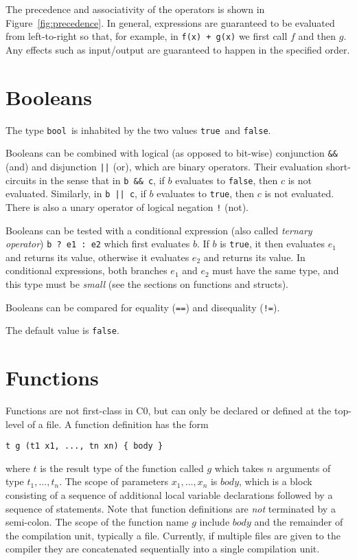 \documentclass[11pt]{article}
\newcommand{\tbool}{\texttt{bool}}
\newcommand{\vtrue}{\texttt{true}}
\newcommand{\vfalse}{\texttt{false}}
\begin{document}
The precedence and associativity of the operators is shown
in Figure~\ref{fig:precedence}.  In general, expressions are
guaranteed to be evaluated from left-to-right so that, for example,
in \verb'f(x) + g(x)' we first call $f$ and then $g$.  Any effects
such as input/output are guaranteed to happen in the specified
order.

\section{Booleans}

The type \tbool\ is inhabited by the two values \vtrue\ and \vfalse.

Booleans can be combined with logical (as opposed to bit-wise)
conjunction \verb'&&' (and) and disjunction \verb'||' (or), which are
binary operators.  Their evaluation short-circuits in the sense that
in \verb'b && c', if $b$ evaluates to \vfalse, then $c$ is not
evaluated.  Similarly, in \verb'b || c', if $b$ evaluates to \vtrue,
then $c$ is not evaluated.  There is also a unary operator of logical
negation \verb'!' (not).

Booleans can be tested with a conditional expression (also
called \emph{ternary operator}) \verb'b ? e1 : e2'
which first evaluates $b$.  If $b$ is \vtrue, it then evaluates
$e_1$ and returns its value, otherwise it evaluates $e_2$
and returns its value.  In conditional expressions, both
branches $e_1$ and $e_2$ must have the same type, and this type
must be \emph{small} (see the sections on functions and
structs).

Booleans can be compared for equality (\verb'==') and disequality
(\verb'!=').

The default value is \vfalse.

\section{Functions}

Functions are not first-class in C0, but can only be declared
or defined at the top-level of a file.  A function definition
has the form
\begin{verbatim}
t g (t1 x1, ..., tn xn) { body }
\end{verbatim}
where $t$ is the result type of the function called $g$ which takes
$n$ arguments of type $t_1, \ldots, t_n$.  The scope of parameters
$x_1, \ldots, x_n$ is $\mathit{body}$, which is a block consisting of
a sequence of additional local variable declarations followed by a
sequence of statements.  Note that function definitions are \emph{not}
terminated by a semi-colon.  The scope of the function name $g$
include $\mathit{body}$ and the remainder of the compilation unit,
typically a file.  Currently, if multiple files are given to
the compiler they are concatenated sequentially into a single
compilation unit.
\end{document}

